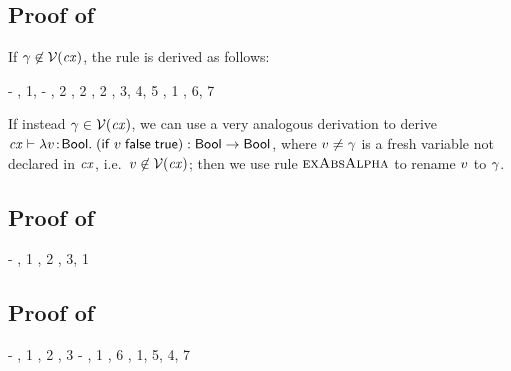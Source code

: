 \subsection*{Proof of }

If $\gamma\not\in\mathcal{V}(\mathit{cx})$, the rule is derived as follows:
\begin{derivation}
\step{\cxwfO}
     {\hyp}
\step{\cxwf{\snoc{\cx}{\vdec{\varfx}{\bool}}}}
     {\Rcxvdecbool, 1, \hyp}
\step{\hasty{\snoc{\cx}{\vdec{\varfx}{\bool}}}{\varfx}{\bool}}
     {\Revar, 2}
\step{\hasty{\snoc{\cx}{\vdec{\varfx}{\bool}}}{\false}{\bool}}
     {\Refalse, 2}
\step{\hasty{\snoc{\cx}{\vdec{\varfx}{\bool}}}{\true}{\bool}}
     {\Retrue, 2}
\step{\hasty{\snoc{\cx}{\vdec{\varfx}{\bool}}}
            {\iif{\varfx}{\false}{\true}}
            {\bool}}
     {\ReifO, 3, 4, 5}
\step{\istyO{\bool}}
     {\Rtbool, 1}
\step{\hastyO{\abs{\varfx}{\bool}{(\iif{\varfx}{\false}{\true})}}
             {\tarr{\bool}{\bool}}}
     {\Reabs, 6, 7}
\end{derivation}
If instead $\gamma\in\mathcal{V}(\mathit{cx})$, we can use a very analogous derivation to
derive
$\mathit{cx}\vdash\lambda v\!:\!\mathsf{Bool}.\;(\mathsf{if}\;v\;\mathsf{false}\;\mathsf{true}):\mathsf{Bool}\to\mathsf{Bool}$,
where $v\neq\gamma$ is a fresh variable not declared in $\mathit{cx}$, i.e.\
$v\not\in\mathcal{V}(\mathit{cx})$; then we use rule $\textsc{exAbsAlpha}$ to rename $v$ to
$\gamma$.



\subsection*{Proof of }

\begin{derivation}
\step{\hastyO{\expr}{\bool}}
     {\hyp}
\step{\cxwfO}
     {, 1}
\step{\hastyO{\negaop}{\tarr{\bool}{\bool}}}
     {\Renot, 2}
\step{\hastyO{\negaO}{\bool}}
     {\Reapp, 3, 1}
\end{derivation}



\subsection*{Proof of \thmref{thm-econj}}

\begin{derivation}
     {\hyp}
     {\Renega, 1}
     {\Rcxaxmono, 2}
     {\Refalse, 3}
     {\hyp}
\step{\cxwfO}
     {, 1}
\step{\istyO{\bool}}
     {\Rtbool, 6}
     {\Reif, 1, 5, 4, 7}
\end{derivation}




